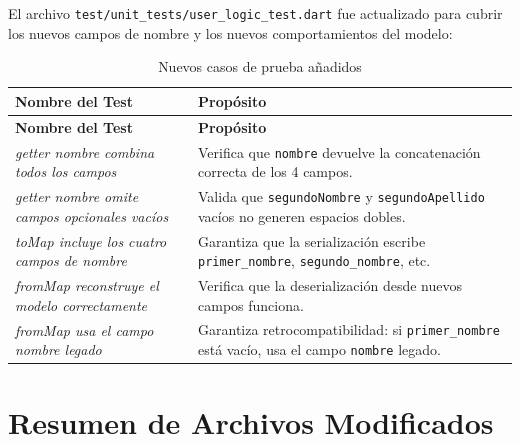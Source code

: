 \documentclass[12pt,a4paper]{article}
\begin{document}
El archivo \texttt{test/unit\_tests/user\_logic\_test.dart} fue actualizado para cubrir
los nuevos campos de nombre y los nuevos comportamientos del modelo:

\begin{longtable}{p{6cm} p{7.5cm}}
\caption{Nuevos casos de prueba añadidos} \label{tab:tests} \\
\toprule
\textbf{Nombre del Test} & \textbf{Propósito} \\
\midrule
\endfirsthead
\toprule
\textbf{Nombre del Test} & \textbf{Propósito} \\
\midrule
\endhead
\bottomrule
\endlastfoot
\textit{getter nombre combina todos los campos} &
  Verifica que \texttt{nombre} devuelve la concatenación correcta de los 4 campos. \\[0.5em]
\textit{getter nombre omite campos opcionales vacíos} &
  Valida que \texttt{segundoNombre} y \texttt{segundoApellido} vacíos no generen espacios dobles. \\[0.5em]
\textit{toMap incluye los cuatro campos de nombre} &
  Garantiza que la serialización escribe \texttt{primer\_nombre}, \texttt{segundo\_nombre}, etc. \\[0.5em]
\textit{fromMap reconstruye el modelo correctamente} &
  Verifica que la deserialización desde nuevos campos funciona. \\[0.5em]
\textit{fromMap usa el campo nombre legado} &
  Garantiza retrocompatibilidad: si \texttt{primer\_nombre} está vacío, usa el campo \texttt{nombre} legado. \\
\end{longtable}

\section{Resumen de Archivos Modificados}
\end{document}

